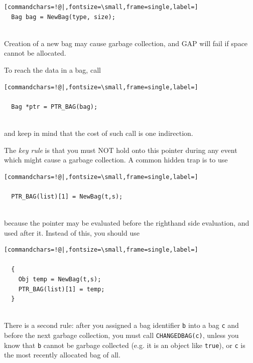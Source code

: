 \documentclass[a4paper,11pt]{report}
\begin{document}
{{{\begin{Verbatim}[commandchars=!@|,fontsize=\small,frame=single,label=]
  Bag bag = NewBag(type, size);
  
\end{Verbatim}
 Creation of a new bag may cause garbage collection, and \textsf{GAP} will fail if space cannot be allocated. 

 To reach the data in a bag, call 
\begin{Verbatim}[commandchars=!@|,fontsize=\small,frame=single,label=]
  
  Bag *ptr = PTR_BAG(bag);
  
\end{Verbatim}
 and keep in mind that the cost of such call is one indirection. 

 The \emph{key rule} is that you must NOT hold onto this pointer during any event which might cause
a garbage collection. A common hidden trap is to use 
\begin{Verbatim}[commandchars=!@|,fontsize=\small,frame=single,label=]
  
  PTR_BAG(list)[1] = NewBag(t,s);
  
\end{Verbatim}
 because the pointer may be evaluated before the right\texttt{}hand
side evaluation, and used after it. Instead of this, you should use 
\begin{Verbatim}[commandchars=!@|,fontsize=\small,frame=single,label=]
  
  {
    Obj temp = NewBag(t,s);
    PTR_BAG(list)[1] = temp;
  }
  
\end{Verbatim}
 There is a second rule: after you assigned a bag identifier \texttt{b} into a bag \texttt{c} and before the next garbage collection, you must call \texttt{CHANGED{\textunderscore}BAG(c)}, unless you know that \texttt{b} cannot be garbage collected (e.g. it is an object like \texttt{true}), or \texttt{c} is the most recently allocated bag of all. 

}}}
\end{document}
